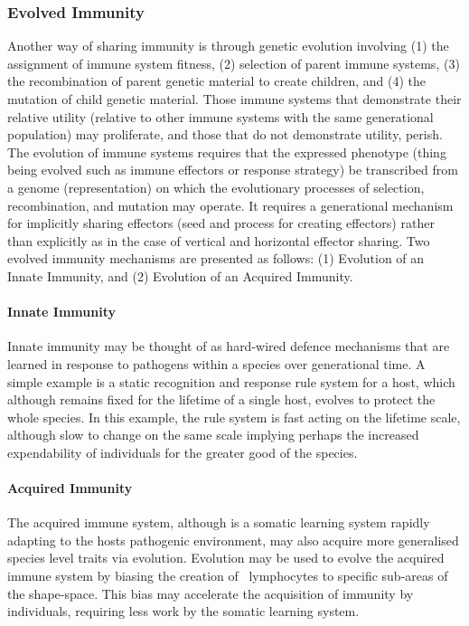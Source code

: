 \subsubsection{Evolved Immunity}
\label{sec:hosts:paradigm:interaction:evolution}
Another way of sharing immunity is through genetic evolution involving (1) the assignment of immune system fitness, (2) selection of parent immune systems, (3) the recombination of parent genetic material to create children, and (4) the mutation of child genetic material. Those immune systems that demonstrate their relative utility (relative to other immune systems with the same generational population) may proliferate, and those that do not demonstrate utility, perish. The evolution of immune systems requires that the expressed phenotype (thing being evolved such as immune effectors or response strategy) be transcribed from a genome (representation) on which the evolutionary processes of selection, recombination, and mutation may operate. It requires a generational mechanism for implicitly sharing effectors (seed and process for creating effectors) rather than explicitly as in the case of vertical and horizontal effector sharing. Two evolved immunity mechanisms are presented as follows: (1) Evolution of an Innate Immunity, and (2) Evolution of an Acquired Immunity.

\paragraph{Innate Immunity}
Innate immunity may be thought of as hard-wired defence mechanisms that are learned in response to pathogens within a species over generational time. A simple example is a static recognition and response rule system for a host, which although remains fixed for the lifetime of a single host, evolves to protect the whole species. In this example, the rule system is fast acting on the lifetime scale, although slow to change on the same scale implying perhaps the increased expendability of individuals for the greater good of the species.	

\paragraph{Acquired Immunity}
The acquired immune system, although is a somatic learning system rapidly adapting to the hosts pathogenic environment, may also acquire more generalised species level traits via evolution. Evolution may be used to evolve the acquired immune system by biasing the creation of \naive\ lymphocytes to specific sub-areas of the shape-space. This bias may accelerate the acquisition of immunity by individuals, requiring less work by the somatic learning system.	


